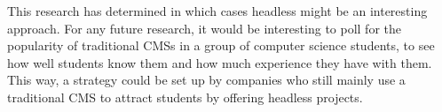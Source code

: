This research has determined in which cases headless might be an interesting approach. For any future research, it would be interesting to poll for the popularity of traditional CMSs in a group of computer science students, to see how well students know them and how much experience they have with them. This way, a strategy could be set up by companies who still mainly use a traditional CMS to attract students by offering headless projects.
